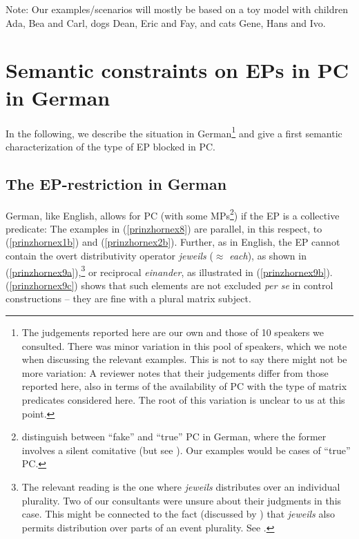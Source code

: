 \documentclass[output=paper,colorlinks,citecolor=brown,
]{langscibook}
\begin{document}
Note: Our examples/scenarios will mostly be based on a toy model with children Ada, Bea and Carl, dogs Dean, Eric and Fay, and cats Gene, Hans and Ivo. 



\section{Semantic constraints on EPs in PC in German}\label{prinzhornsec:2}

In the following, we describe the situation in German\footnote{The judgements reported here are our own and those of 10 speakers we consulted. There was minor variation in this pool of speakers, which we note when discussing the relevant examples. This is not to say there might not be more variation: A reviewer notes that their judgements differ from those reported here, also in terms of the availability of PC with the type of matrix predicates considered here. The root of this variation is unclear to us at this point.} and give a first semantic characterization of the type of EP blocked in PC.

\subsection{The EP-restriction in German}\label{prinzhornsec:2.1}

German, like English, allows for PC (with some MPs\footnote{\cite{Pitteroff:2017} distinguish between “fake” and “true” PC in German, where the former involves a silent comitative (but see \citealt{Landau:2016}). Our examples would be cases of “true” PC.}) if the EP is a collective predicate: The examples in (\ref{prinzhornex8}) are parallel, in this respect, to (\ref{prinzhornex1b}) and  (\ref{prinzhornex2b}). Further, as in English, the EP cannot contain the overt distributivity operator \textit{jeweils} ($\approx$ \textit{each}), as shown in (\ref{prinzhornex9a}),\footnote{The relevant reading is the one where \textit{jeweils} distributes over an individual plurality. Two of our consultants were unsure about their judgments in this case. This might be connected to  the fact (discussed by \citealt{Zimmermann:2002}) that \textit{jeweils} also permits distribution over parts of an event plurality.  See .} or reciprocal \textit{einander}, as illustrated in (\ref{prinzhornex9b}). (\ref{prinzhornex9c}) shows that such elements are not excluded \textit{per se} in control constructions -- they are fine with a plural matrix subject.
\end{document}
